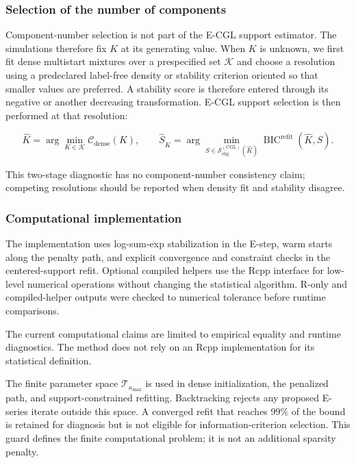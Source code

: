\documentclass[preprint,12pt,authoryear]{elsarticle}
\newcounter{algorithm}
\begin{document}
\subsubsection{Selection of the number of components}
\label{subsec:k-selection}

Component-number selection is not part of the E-CGL support estimator. The
simulations therefore fix $K$ at its generating value. When $K$ is unknown,
we first fit dense multistart mixtures over a prespecified set $\mathcal K$ and
choose a resolution using a predeclared label-free density or stability
criterion oriented so that smaller values are preferred. A stability score is
therefore entered through its negative or another decreasing transformation.
E-CGL support selection is then performed at that resolution:

\[
\widehat K
=\arg\min_{K\in\mathcal K}\mathcal C_{\mathrm{dense}}(K),
\qquad
\widehat S_{\widehat K}
=\arg\min_{S\in\mathcal S_{\mathrm{elig}}^{(\mathrm{CGL})}(\widehat K)}
\operatorname{BIC}^{\mathrm{refit}}(\widehat K,S).
\]

This two-stage diagnostic has no component-number consistency claim; competing
resolutions should be reported when density fit and stability disagree.

\subsubsection{Computational implementation}

The implementation uses log-sum-exp stabilization in the E-step, warm starts
along the penalty path, and explicit convergence and constraint checks in the
centered-support refit. Optional compiled helpers use the Rcpp interface
\citep{eddelbuettel2011rcpp} for low-level numerical operations without
changing the statistical algorithm. R-only and compiled-helper outputs were
checked to numerical tolerance before runtime comparisons.

The current computational claims are limited to empirical equality and runtime
diagnostics. The method does not rely on an Rcpp implementation for its
statistical definition.

The finite parameter space $\mathcal T_{\kappa_{\max}}$ is used in dense
initialization, the penalized path, and support-constrained refitting.
Backtracking rejects any proposed E-series iterate outside this space.
A converged refit that reaches 99\% of the bound is retained for diagnosis but
is not eligible for information-criterion selection. This guard defines the
finite computational problem; it is not an additional sparsity penalty.
\end{document}
